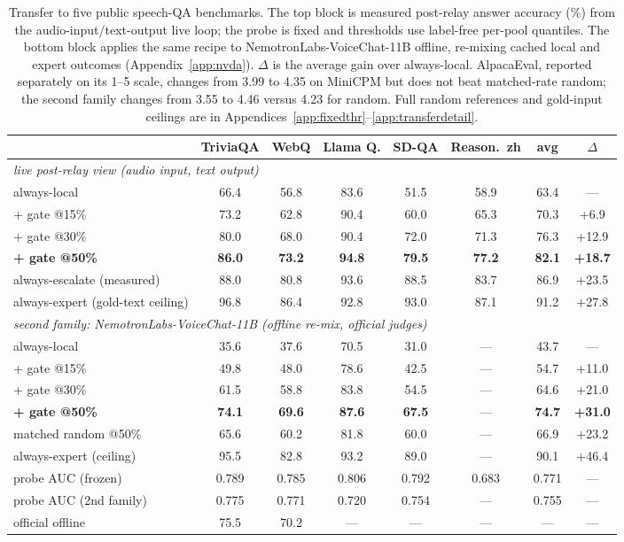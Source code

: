 \begin{table}[t]
\centering\scriptsize
\setlength{\tabcolsep}{3.5pt}
\renewcommand{\arraystretch}{0.92}
\caption{Transfer to five public speech-QA benchmarks. The top block is
measured post-relay answer accuracy (\%) from the audio-input/text-output
live loop; the probe is fixed and thresholds use label-free per-pool
quantiles. The bottom block applies the same recipe to
NemotronLabs-VoiceChat-11B offline, re-mixing cached local and expert
outcomes (Appendix~\ref{app:nvda}). $\Delta$ is the average gain over
always-local. AlpacaEval, reported separately on its 1--5 scale,
changes from 3.99 to 4.35 on MiniCPM but does not beat matched-rate
random; the second family changes from 3.55 to 4.46 versus 4.23 for
random. Full random references and gold-input ceilings are in
Appendices~\ref{app:fixedthr}--\ref{app:transferdetail}.}
\label{tab:transfer}
\begin{tabular}{lccccccc}
\toprule
& TriviaQA & WebQ & Llama Q. & SD-QA & Reason.\ zh & avg & $\Delta$ \\
\midrule
\multicolumn{8}{l}{\emph{live post-relay view (audio input, text output)}} \\
always-local          & 66.4 & 56.8 & 83.6 & 51.5 & 58.9 & 63.4 & --- \\
\;+ gate @15\%        & 73.2 & 62.8 & 90.4 & 60.0 & 65.3 & 70.3 & +6.9 \\
\;+ gate @30\%        & 80.0 & 68.0 & 90.4 & 72.0 & 71.3 & 76.3 & +12.9 \\
\;\textbf{+ gate @50\%} & \textbf{86.0} & \textbf{73.2} & \textbf{94.8} & \textbf{79.5} & \textbf{77.2} & \textbf{82.1} & \textbf{+18.7} \\
always-escalate (measured) & 88.0 & 80.8 & 93.6 & 88.5 & 83.7 & 86.9 & +23.5 \\
always-expert (gold-text ceiling) & 96.8 & 86.4 & 92.8 & 93.0 & 87.1 & 91.2 & +27.8 \\
\midrule
\multicolumn{8}{l}{\emph{second family: NemotronLabs-VoiceChat-11B (offline re-mix, official judges)}} \\
always-local          & 35.6 & 37.6 & 70.5 & 31.0 & --- & 43.7 & --- \\
\;+ gate @15\%        & 49.8 & 48.0 & 78.6 & 42.5 & --- & 54.7 & +11.0 \\
\;+ gate @30\%        & 61.5 & 58.8 & 83.8 & 54.5 & --- & 64.6 & +21.0 \\
\;\textbf{+ gate @50\%} & \textbf{74.1} & \textbf{69.6} & \textbf{87.6} & \textbf{67.5} & --- & \textbf{74.7} & \textbf{+31.0} \\
\;matched random @50\% & 65.6 & 60.2 & 81.8 & 60.0 & --- & 66.9 & +23.2 \\
always-expert (ceiling) & 95.5 & 82.8 & 93.2 & 89.0 & --- & 90.1 & +46.4 \\
\midrule
probe AUC (frozen)    & 0.789 & 0.785 & 0.806 & 0.792 & 0.683 & 0.771 & --- \\
probe AUC (2nd family) & 0.775 & 0.771 & 0.720 & 0.754 & --- & 0.755 & --- \\
official offline      & 75.5 & 70.2 & ---  & ---  & ---  & ---  & --- \\
\bottomrule
\end{tabular}
\end{table}

